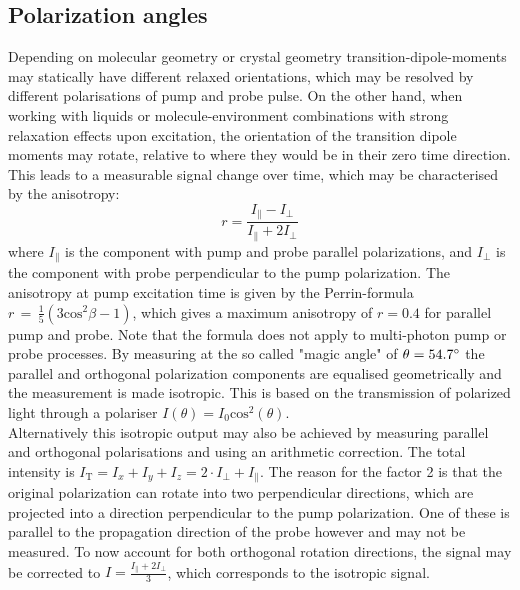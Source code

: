 \documentclass[twoside,openright,listof=numbered]{scrreprt}
\begin{document}
\subsection{Polarization angles}\label{sec:PolAngles}
Depending on molecular geometry or crystal geometry transition-dipole-moments may statically have different relaxed orientations, which may be resolved by different polarisations of pump and probe pulse. On the other hand, when working with liquids or molecule-environment combinations with strong relaxation effects upon excitation, the orientation of the transition dipole moments may rotate, relative to where they would be in their zero time direction. This leads to a measurable signal change over time, which may be characterised by the anisotropy:\cite[chapter 10]{Lakowicz2008}
\begin{equation*}
r = \frac{I_{\parallel}-I_{\perp}}{I_{\parallel}+2I_{\perp}}
\end{equation*}
where $I_\parallel$ is the component with pump and probe parallel polarizations, and $I_\perp$ is the component with probe perpendicular to the pump polarization. The anisotropy at pump excitation time is given by the Perrin-formula $r\, =\, \frac{1}{5}\left(3\mathrm{cos^2}\beta-1\right)$, which gives a maximum anisotropy of $r=0.4$ for parallel pump and probe. Note that the formula does not apply to multi-photon pump or probe processes.  By measuring at the so called "magic angle" of $\theta = 54.7 \degree$ the parallel and orthogonal polarization components are equalised geometrically and the measurement is made isotropic. This is based on the transmission of polarized light through a polariser $I(\theta) = I_0 \mathrm{cos}^2(\theta)$. \cite[chapter 10]{Lakowicz2008}\cite{Schalk2010}\\
Alternatively this isotropic output may also be achieved by measuring parallel and orthogonal polarisations and using an arithmetic correction. The total intensity is $I_\text{T} = I_x+I_y+I_z = 2\cdot I_\perp + I_\parallel$. The reason for the factor 2 is that the original polarization can rotate into two perpendicular directions, which are projected into a direction perpendicular to the pump polarization. One of these is parallel to the propagation direction of the probe however and may not be measured. To now account for both orthogonal rotation directions, the signal may be corrected to $I = \frac{I_\parallel + 2I_\perp}{3}$, which corresponds to the isotropic signal.\cite{Zheng2020}
\end{document}
